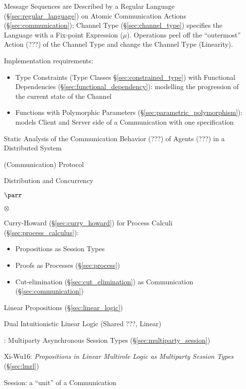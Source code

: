 Message Sequences are Described by a Regular Language
(\S\ref{sec:regular_language}) on Atomic Communication Actions
(\S\ref{sec:communication}); Channel Type (\S\ref{sec:channel_type})
specifies the Language with a Fix-point Expression ($\mu$). Operations
peel off the ``outermost'' Action (???) of the Channel Type and change
the Channel Type (Linearity). \cite{neubauer-thiemann04}

Implementation requirements: \cite{neubauer-thiemann04}
\begin{itemize}
  \item Type Constraints (Type Classes \S\ref{sec:constrained_type})
    with Functional Dependencies (\S\ref{sec:functional_dependency}):
    modelling the progression of the current state of the Channel
  \item Functions with Polymorphic Parameters
    (\S\ref{sec:parametric_polymorphism}): models Client and Server
    side of a Communication with one specification
\end{itemize}

Static Analysis of the Communication Behavior (???) of Agents (???) in
a Distributed System \cite{gay-vasconcelos10}

(Communication) Protocol

Distribution and Concurrency

$\parr$

$\otimes$

Curry-Howard (\S\ref{sec:curry_howard}) for Process Calculi
(\S\ref{sec:process_calculus}):
\begin{itemize}
  \item Propositions as Session Types
  \item Proofs as Processes (\S\ref{sec:process})
  \item Cut-elimination (\S\ref{sec:cut_elimination}) as Communication
    (\S\ref{sec:communication})
\end{itemize}

Linear Propositions (\S\ref{sec:linear_logic})

Dual Intuitionistic Linear Logic \cite{caires-pfenning10} (Shared ???,
Linear)

\cite{honda-yoshida-carbone08}: Multiparty Asynchronous Session Types
(\S\ref{sec:multiparty_session})

Xi-Wu16: \emph{Propositions in Linear Multirole Logic as
  Multiparty Session Types} (\S\ref{sec:lmrl})

Session: a ``unit'' of a Communication

